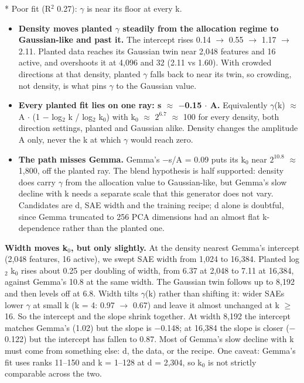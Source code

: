 \documentclass[11pt]{article}
\begin{document}
* Poor fit (R$^2$ 0.27): $\gamma$ is near its floor at every k.

\begin{itemize}
\item \textbf{Density moves planted $\gamma$ steadily from the allocation regime to Gaussian-like and past it.} The intercept rises 0.14 $\to$ 0.55 $\to$ 1.17 $\to$ 2.11. Planted data reaches its Gaussian twin near 2,048 features and 16 active, and overshoots it at 4,096 and 32 (2.11 vs 1.60). With crowded directions at that density, planted $\gamma$ falls back to near its twin, so crowding, not density, is what pins $\gamma$ to the Gaussian value.
\item \textbf{Every planted fit lies on one ray: s $\approx$ $-$0.15 $\cdot$ A.} Equivalently $\gamma$(k) $\approx$ A $\cdot$ (1 $-$ log$_2$ k / log$_2$ k$_0$) with k$_0$ $\approx$ $2^{6.7}$ $\approx$ 100 for every density, both direction settings, planted and Gaussian alike. Density changes the amplitude A only, never the k at which $\gamma$ would reach zero.
\item \textbf{The path misses Gemma.} Gemma's $-$s/A = 0.09 puts its k$_0$ near $2^{10.8}$ $\approx$ 1,800, off the planted ray. The blend hypothesis is half supported: density does carry $\gamma$ from the allocation value to Gaussian-like, but Gemma's slow decline with k needs a separate scale that this generator does not vary. Candidates are d, SAE width and the training recipe; d alone is doubtful, since Gemma truncated to 256 PCA dimensions had an almost flat k-dependence rather than the planted one.
\end{itemize}

\textbf{Width moves k$_0$, but only slightly.} At the density nearest Gemma's intercept (2,048 features, 16 active), we swept SAE width from 1,024 to 16,384. Planted log$_2$ k$_0$ rises about 0.25 per doubling of width, from 6.37 at 2,048 to 7.11 at 16,384, against Gemma's 10.8 at the same width. The Gaussian twin follows up to 8,192 and then levels off at 6.8. Width tilts $\gamma$(k) rather than shifting it: wider SAEs lower $\gamma$ at small k (k = 4: 0.97 $\to$ 0.67) and leave it almost unchanged at k $\ge$ 16. So the intercept and the slope shrink together. At width 8,192 the intercept matches Gemma's (1.02) but the slope is $-$0.148; at 16,384 the slope is closer ($-$0.122) but the intercept has fallen to 0.87. Most of Gemma's slow decline with k must come from something else: d, the data, or the recipe. One caveat: Gemma's fit uses ranks 11--150 and k = 1--128 at d = 2,304, so k$_0$ is not strictly comparable across the two.
\end{document}
